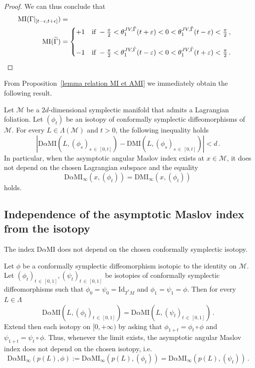 \documentclass[AHL, Unicode, longabstracts, published]{cedram}
\newcommand*\M{\mathcal{M}}
\newcommand{\rId}{\mathrm{Id}}
\newcommand{\DMI}{\mathrm{DMI}}
\newcommand{\MI}{\mathrm{MI}}
\newcommand{\rmD}{\mathrm{D}}
\let\oldtilde\tilde
\renewcommand*{\tilde}[1]{\mathchoice{\widetilde{#1}}{\widetilde{#1}}{\oldtilde{#1}}{\oldtilde{#1}}}
\begin{document}
\begin{proof}
We can thus conclude that
\begin{align*}
\MI(\Gamma|_{[t-\epsilon,t+\epsilon]})&=\\
\MI(\tilde\Gamma)&=
\begin{cases}
+1\quad\text{if }-\frac \pi 2 <\theta_1^{JV,\tilde\Gamma}({ t+\varepsilon})<0<\theta_1^{JV,\tilde\Gamma}({ t-\varepsilon})<\frac\pi 2\,,\\
\\
-1\quad\text{if }-\frac \pi 2 <\theta_1^{JV,\tilde\Gamma}({ t-\varepsilon})<0<\theta_1^{JV,\tilde\Gamma}({ t+\varepsilon})<\frac\pi 2\,.\qedhere
\end{cases}
\end{align*}
\end{proof}

From Proposition~\ref{lemma relation MI et AMI} we immediately obtain the following result.

\begin{coro}\label{comparison DAMI et DMI}
Let $\M$ be a $2d$-dimensional symplectic manifold that admits a Lagrangian foliation. Let $(\phi_t) $ be an isotopy of conformally symplectic diffeomorphisms of $\M$. For every $L\in\Lambda(\M)$ and $t>0$, the following inequality holds
\begin{equation}
\left\vert\rmD\alpha\MI\left(L,(\phi_s)_{s\,\in\,[0,t]}\right)-\DMI\left(L,(\phi_s)_{s\,\in\,[0,t]}\right)\right\vert < d\,.
\end{equation}
In particular, when the asymptotic angular Maslov index exists at $x\in\M$, it does not depend on the chosen Lagrangian subspace and the equality
\[
\rmD\alpha\MI_{\infty}(x,(\phi_t))=\DMI_\infty(x,(\phi_t))\,
\]
holds.
\end{coro}


\subsection{Independence of the asymptotic Maslov index from the isotopy}

The index $\rmD\alpha\MI$ does not depend on the chosen conformally symplectic isotopy.

\begin{prop}\label{independence isotopy}
Let $\phi$ be a conformally symplectic diffeomorphism isotopic to the identity on $\M$. Let $(\phi_t)_{t\,\in\,[0,1]}, (\psi_t)_{t\,\in\,[0,1]}$ be isotopies of conformally symplectic diffeomorphisms such that $\phi_0=\psi_0=\rId_{T^*M}$ and $\phi_1=\psi_1=\phi$. Then for every $L\in\Lambda$
\[
\rmD\alpha\MI\left(L, (\phi_t)_{t\,\in\,[0,1]}\right)=\rmD\alpha\MI\left(L, (\psi_t)_{t\,\in\,[0,1]}\right)\,.
\]
Extend then each isotopy on $[0,+\infty)$ by asking that $\phi_{1+t}=\phi_t\circ\phi$ and $\psi_{1+t}=\psi_t\circ\phi$. Thus, whenever the limit exists, the asymptotic angular Maslov index does not depend on the chosen isotopy, i.e.
\[
\rmD\alpha\MI_\infty(p(L),\phi):=\rmD\alpha\MI_\infty(p(L), (\phi_t))=\rmD\alpha\MI_\infty(p(L), (\psi_t))\,.
\]
\end{prop}
\end{document}
